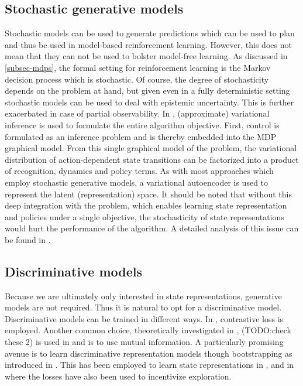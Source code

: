 \subsection{Stochastic generative models}
Stochastic models can be used to generate 
predictions which can be used to plan and thus be used in model-based reinforcement learning.
However, this does not mean that they can not be used to bolster model-free learning.
As discussed in \ref{subsec-mdps}, the formal setting for reinforcement learning is 
the Markov decision process which is stochastic.
Of course, the degree of stochasticity depends on the problem at hand,
but given even in a fully deterministic setting stochastic models
can be used to deal with epistemic uncertainty.
This is further exacerbated in case of partial observability.
In \cite{slac}, (approximate) variational inference is used to formulate the entire algorithm objective.
First, control is formulated as an inference problem and is thereby embedded into the
MDP graphical model. From this single graphical model of the problem,
the variational distribution of action-dependent state transitions can be factorized
into a product of recognition, dynamics and policy terms.
As with most approaches which employ stochastic generative models, 
a variational autoencoder is used to represent the latent (representation) space.
It should be noted that without this deep integration with the problem,
which enables learning state representation and policies under a single objective,
the stochasticity of state representations would hurt the performance of the algorithm.
A detailed analysis of this issue can be found in \cite{sac+ae}.



\subsection{Discriminative models}
Because we are ultimately only interested in state representations, generative models are not required.
Thus it is natural to opt for a discriminative model.
Discriminative models can be trained in different ways.
In \cite{curl}, contrastive loss is employed.
Another common choice, theoretically investigated in \cite{rakelly2021mutual},
(TODO:check these 2)
is used in \cite{anand2019unsupervised} and \cite{mazoure2020deep} is to use mutual information.
A particularly promising avenue is to learn discriminative representation models
though bootstrapping as introduced in \cite{grill2020bootstrap}.
This has been employed to learn state representations in \cite{schwarzer2020data}, and in \cite{merckling2022exploratory}
where the losses have also been used to incentivize exploration.


